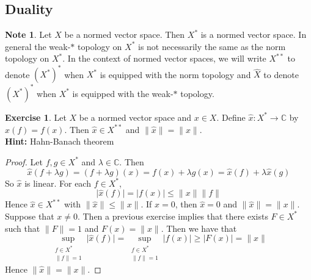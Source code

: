 \documentclass[12pt]{amsart}
\theoremstyle{definition}
\newtheorem{note}[definition]{Note}
\newtheorem{ex}[definition]{Exercise}
\newcommand{\lam}{\lambda}
\newcommand{\C}{\mathbb{C}}
\newcommand{\lex}[1]{\label{ex:#1}}
\begin{document}
	



























	\newpage
	\subsection{Duality}

	\begin{note}
		Let $X$ be a normed vector space. Then $X^*$ is a normed vector space. In general the weak-$*$ topology on $X^*$ is not necessarily the same as the norm topology on $X^*$. In the context of normed vector spaces, we will write $X^{**}$ to denote $(X^*)^*$ when $X^*$ is equipped with the norm topology and $\hat{X}$ to denote $(X^*)^*$ when $X^*$ is equipped with the weak-$*$ topology. 
	\end{note}
	
	\begin{ex} \lex{}
		Let $X$ be a normed vector space and $x \in X$. Define $\hat{x}:X^* \rightarrow \C$ by $\hat{x}(f) = f(x)$. Then $\hat{x} \in X^{**}$ and $\|\hat{x} \|= \|x \|$. \\
		\textbf{Hint:} Hahn-Banach theorem
	\end{ex}
	
	\begin{proof}
		Let $f,g \in X^*$ and $\lam \in \C$. Then $$\hat{x}(f+\lam g) = (f+ \lam g)(x) = f(x) + \lam g(x) = \hat{x}(f) + \lam \hat{x}(g)$$
		So $\hat{x}$ is linear. For each $f \in X^*$, $$\vert \hat{x}(f) \vert = \vert f(x) \vert \leq \|x \|\|f \|$$ Hence $\hat{x} \in X^{**}$ with $\|\hat{x} \|\leq \|x \|$. If $x=0$, then $\hat{x} = 0$ and $\|\hat{x} \|= \|x \|$. Suppose that $x \neq 0$. Then a previous exercise implies that there exists $F \in X^*$ such that $\|F \|=1$ and $F(x) = \|x \|$. Then we have that $$\sup_{\substack{f \in X^* \\ \|f \|= 1 } } \vert \hat{x}(f) \vert  = \sup_{\substack{f \in X^* \\ \|f \|= 1 }}  \vert f(x) \vert \geq \vert F(x) \vert = \|x \|$$
		Hence $\|\hat{x} \|= \|x \|$.
	\end{proof}
\end{document}
